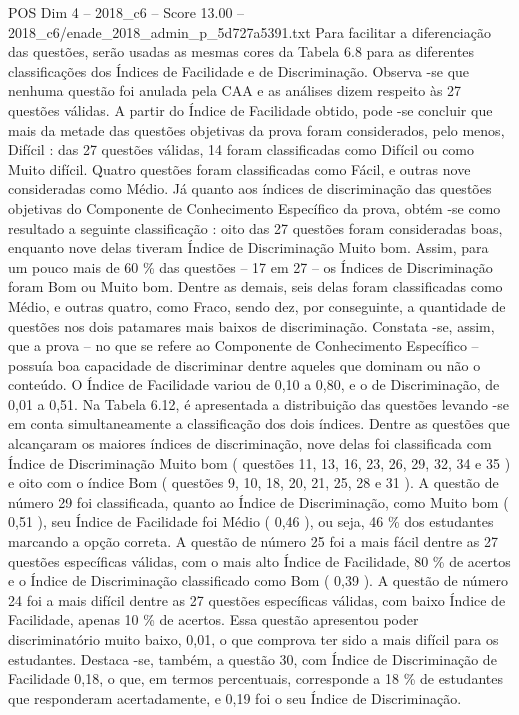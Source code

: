 \begin{textsample}{POS Dim 4 – 2018\_c6 – Score 13.00 – 2018\_c6/enade\_2018\_admin\_p\_5d727a5391.txt}
Para facilitar a diferenciação das questões, serão usadas as mesmas cores da Tabela 6.8 para as diferentes classificações dos Índices de Facilidade e de Discriminação.
Observa -se que nenhuma questão foi anulada pela CAA e as análises dizem respeito às 27 questões válidas.
A partir do Índice de Facilidade obtido, pode -se concluir que mais da metade das questões objetivas da prova foram considerados, pelo menos, Difícil : das 27 questões válidas, 14 foram classificadas como Difícil ou como Muito difícil.
Quatro questões foram classificadas como Fácil, e outras nove consideradas como Médio.
Já quanto aos índices de discriminação das questões objetivas do Componente de Conhecimento Específico da prova, obtém -se como resultado a seguinte classificação : oito das 27 questões foram consideradas boas, enquanto nove delas tiveram Índice de Discriminação Muito bom.
Assim, para um pouco mais de 60 \% das questões – 17 em 27 – os Índices de Discriminação foram Bom ou Muito bom.
Dentre as demais, seis delas foram classificadas como Médio, e outras quatro, como Fraco, sendo dez, por conseguinte, a quantidade de questões nos dois patamares mais baixos de discriminação.
Constata -se, assim, que a prova – no que se refere ao Componente de Conhecimento Específico – possuía boa capacidade de discriminar dentre aqueles que dominam ou não o conteúdo.
O Índice de Facilidade variou de 0,10 a 0,80, e o de Discriminação, de 0,01 a 0,51.
Na Tabela 6.12, é apresentada a distribuição das questões levando -se em conta simultaneamente a classificação dos dois índices.
Dentre as questões que alcançaram os maiores índices de discriminação, nove delas foi classificada com Índice de Discriminação Muito bom ( questões 11, 13, 16, 23, 26, 29, 32, 34 e 35 ) e oito com o índice Bom ( questões 9, 10, 18, 20, 21, 25, 28 e 31 ).
A questão de número 29 foi classificada, quanto ao Índice de Discriminação, como Muito bom ( 0,51 ), seu Índice de Facilidade foi Médio ( 0,46 ), ou seja, 46 \% dos estudantes marcando a opção correta.
A questão de número 25 foi a mais fácil dentre as 27 questões específicas válidas, com o mais alto Índice de Facilidade, 80 \% de acertos e o Índice de Discriminação classificado como Bom ( 0,39 ).
A questão de número 24 foi a mais difícil dentre as 27 questões específicas válidas, com baixo Índice de Facilidade, apenas 10 \% de acertos.
Essa questão apresentou poder discriminatório muito baixo, 0,01, o que comprova ter sido a mais difícil para os estudantes.
Destaca -se, também, a questão 30, com Índice de Discriminação de Facilidade 0,18, o que, em termos percentuais, corresponde a 18 \% de estudantes que responderam acertadamente, e 0,19 foi o seu Índice de Discriminação.

\end{textsample}
